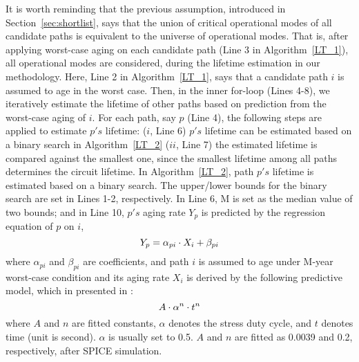 It is worth reminding that the previous assumption, introduced in Section~\ref{sec:shortlist}, says that the union of critical operational modes of all candidate paths is equivalent to the universe of operational modes. That is, after applying worst-case aging on each candidate path (Line 3 in Algorithm~\ref{LT_1}), all operational modes are considered, during the lifetime estimation in our methodology. Here, Line 2 in Algorithm~\ref{LT_1}, says that a candidate path $i$ is assumed to age in the worst case. Then, in the inner for-loop (Lines 4-8), we iteratively estimate the lifetime of other paths based on prediction from the worst-case aging of $i$. For each path, say $p$ (Line 4), the following steps are applied to estimate $p's$ lifetime: ($i$, Line 6) $p's$ lifetime can be estimated based on a binary search in Algorithm~\ref{LT_2} ($ii$, Line 7) the estimated lifetime is compared against the smallest one, since the smallest lifetime among all paths determines the circuit lifetime.
In Algorithm~\ref{LT_2}, path $p's$ lifetime is estimated based on a binary search. The upper/lower bounds for the binary search are set in Lines 1-2, respectively. In Line 6, M is set as the median value of two bounds; and in Line 10, $p's$ aging rate $Y_{p}$ is predicted by the regression equation of $p$ on $i$, 
\begin{equation*}
	\fontsize{8}{8} \selectfont
	Y_{p} = \alpha_{pi} \cdot X_{i} + \beta_{pi}
\end{equation*}
where $ \alpha_{pi}$ and $\beta_{pi}$ are coefficients, and path $i$ is assumed to age under M-year worst-case condition and its aging rate $X_{i}$ is derived by the following predictive model, which in presented in \cite{wang2007efficient}:
\begin{equation}
	\fontsize{8}{8} \selectfont
	A \cdot \alpha^n \cdot t^n 
	\label{eq:worst}
\end{equation}
where $A$ and $n$ are fitted constants, $\alpha$ denotes the stress duty cycle, and $t$ denotes time (unit is second). $\alpha$ is usually set to 0.5. $A$ and $n$ are fitted as 0.0039 and 0.2, respectively, after SPICE simulation.

